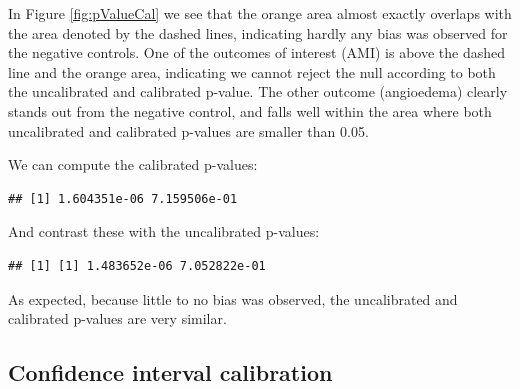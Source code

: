\documentclass[11pt]{book}
\newenvironment{Shaded}{\begin{snugshade}}{\end{snugshade}}
\newcommand{\DataTypeTok}[1]{\textcolor[rgb]{0.13,0.29,0.53}{#1}}
\newcommand{\KeywordTok}[1]{\textcolor[rgb]{0.13,0.29,0.53}{\textbf{#1}}}
\newcommand{\NormalTok}[1]{#1}
\newcommand{\OperatorTok}[1]{\textcolor[rgb]{0.81,0.36,0.00}{\textbf{#1}}}
\newcommand{\StringTok}[1]{\textcolor[rgb]{0.31,0.60,0.02}{#1}}
\theoremstyle{definition}
\theoremstyle{definition}
\theoremstyle{definition}
\theoremstyle{remark}
\begin{document}
In Figure \ref{fig:pValueCal} we see that the orange area almost exactly overlaps with the area denoted by the dashed lines, indicating hardly any bias was observed for the negative controls. One of the outcomes of interest (AMI) is above the dashed line and the orange area, indicating we cannot reject the null according to both the uncalibrated and calibrated p-value. The other outcome (angioedema) clearly stands out from the negative control, and falls well within the area where both uncalibrated and calibrated p-values are smaller than 0.05.

We can compute the calibrated p-values:

\begin{Shaded}
\end{Shaded}

\begin{verbatim}
## [1] 1.604351e-06 7.159506e-01
\end{verbatim}

And contrast these with the uncalibrated p-values:

\begin{Shaded}
\end{Shaded}

\begin{verbatim}
## [1] [1] 1.483652e-06 7.052822e-01
\end{verbatim}

As expected, because little to no bias was observed, the uncalibrated and calibrated p-values are very similar.

\hypertarget{confidence-interval-calibration-1}{%
\subsection{Confidence interval calibration}\label{confidence-interval-calibration-1}}
\end{document}
